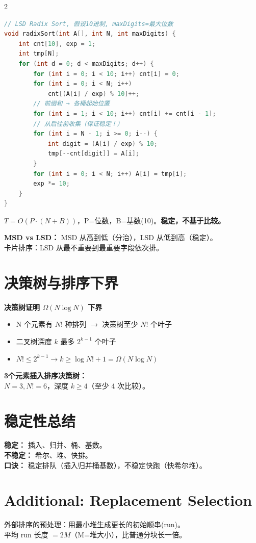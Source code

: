 \documentclass[10pt,a4paper]{article}
\begin{document}
\begin{multicols}{2}
\begin{lstlisting}[language=C]
// LSD Radix Sort, 假设10进制, maxDigits=最大位数
void radixSort(int A[], int N, int maxDigits) {
    int cnt[10], exp = 1;
    int tmp[N];
    for (int d = 0; d < maxDigits; d++) {
        for (int i = 0; i < 10; i++) cnt[i] = 0;
        for (int i = 0; i < N; i++)
            cnt[(A[i] / exp) % 10]++;
        // 前缀和 → 各桶起始位置
        for (int i = 1; i < 10; i++) cnt[i] += cnt[i - 1];
        // 从后往前收集（保证稳定！）
        for (int i = N - 1; i >= 0; i--) {
            int digit = (A[i] / exp) % 10;
            tmp[--cnt[digit]] = A[i];
        }
        for (int i = 0; i < N; i++) A[i] = tmp[i];
        exp *= 10;
    }
}
\end{lstlisting}

$T=O(P\cdot(N+B))$，P=位数，B=基数(10)。\textbf{稳定，不基于比较。}

\textbf{MSD vs LSD：} MSD 从高到低（分治），LSD 从低到高（稳定）。\\
卡片排序：LSD 从最不重要到最重要字段依次排。

\columnbreak

\section*{决策树与排序下界}

\begin{keybox}
\textbf{决策树证明 $\Omega(N\log N)$ 下界}
\begin{itemize}
\item N 个元素有 $N!$ 种排列 $\to$ 决策树至少 $N!$ 个叶子
\item 二叉树深度 $k$ 最多 $2^{k-1}$ 个叶子
\item $N! \le 2^{k-1} \to k \ge \log N! + 1 = \Omega(N\log N)$
\end{itemize}
\textbf{3个元素插入排序决策树：} \\
$N=3, N!=6$，深度 $k\ge 4$（至少 4 次比较）。
\end{keybox}

\section*{稳定性总结}

\textbf{稳定：} 插入、归并、桶、基数。\\
\textbf{不稳定：} 希尔、堆、快排。\\
\textbf{口诀：} 稳定排队（插入归并桶基数），不稳定快跑（快希尔堆）。

\section*{Additional: Replacement Selection}

外部排序的预处理：用最小堆生成更长的初始顺串(run)。\\
平均 run 长度 $=2M$（M=堆大小），比普通分块长一倍。

\end{multicols}
\end{document}
